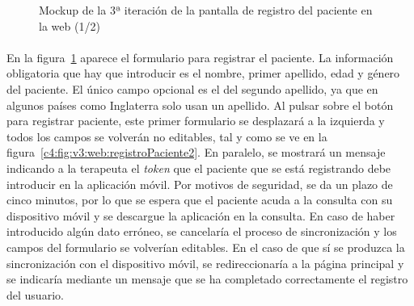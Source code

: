 \begin{figure}[H]
    \centering
    \caption[Mockup de la 3ª iteración de la pantalla de registro del paciente en la web (1/2)]{Mockup de la 3ª iteración de la pantalla de registro del paciente en la web (1/2)}
    \label{c4:fig:v3:web:registroPaciente}
\end{figure}

\paragraph{}
En la figura~\ref{c4:fig:v3:web:registroPaciente} aparece el formulario para registrar el paciente. La información obligatoria que hay que introducir es el nombre, primer apellido, edad y género del paciente. El único campo opcional es el del segundo apellido, ya que en algunos países como Inglaterra solo usan un apellido. Al pulsar sobre el botón para registrar paciente, este primer formulario se desplazará a la izquierda y todos los campos se volverán no editables, tal y como se ve en la figura~\ref{c4:fig:v3:web:registroPaciente2}. En paralelo, se mostrará un mensaje indicando a la terapeuta el \textit{token} que el paciente que se está registrando debe introducir en la aplicación móvil. Por motivos de seguridad, se da un plazo de cinco minutos, por lo que se espera que el paciente acuda a la consulta con su dispositivo móvil y se descargue la aplicación en la consulta. En caso de haber introducido algún dato erróneo, se cancelaría el proceso de sincronización y los campos del formulario se volverían editables. En el caso de que sí se produzca la sincronización con el dispositivo móvil, se redireccionaría a la página principal y se indicaría mediante un mensaje que se ha completado correctamente el registro del usuario.

